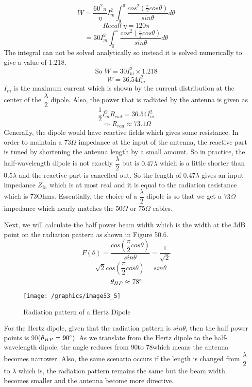 \[ W = \frac{60^2\pi}{\eta} I_m^2 \int_{0}^{\pi} \frac{cos^2(\frac{\pi}{2}cos\theta)}{sin\theta}d\theta \]
\[Recall\ \eta = 120\pi \]
\[ = 30I_m^2 \int_{0}^{\pi}\dfrac{cos^2(\frac{\pi}{2}cos\theta)}{sin\theta}d\theta \]
The integral can not be solved analytically so instead it is solved numerically to give a value of 1.218.
\[ \text{So } W = 30I_m^2 \times 1.218 \]
\begin{equation}
W = 36.54I_m^2
\end{equation}
$I_m$ is the maximum current which is shown by the current distribution at the center of the $\dfrac{\lambda}{2}$ dipole.
Also, the power that is radiated by the antenna is given as $$\dfrac{1}{2}I_m^2 R_{rad} = 36.54I_m^2$$
\[ \Rightarrow R_{rad} \approx 73.1\Omega \]
Generally, the dipole would have reactive fields which gives some resistance. In order to maintain a $73\Omega$ impedance at the input of the antenna, the reactive part is tuned by shortening the antenna length by a small amount. So in practice, the half-wavelength dipole is not exactly $\dfrac{\lambda}{2}$ but is $0.47\lambda$ which is a little shorter than $0.5\lambda$ and the reactive part is cancelled out. So the length of $0.47\lambda$ gives an input impedance $Z_{in}$ which is at most real and it is equal to the radiation resistance which is 73Ohms. Essentially, the choice of a $\dfrac{\lambda}{2}$ dipole is so that we get a $73\Omega$ impedance which nearly matches the $50\Omega$ or $75\Omega$ cables.

Next, we will calculate the half power beam width which is the width at the 3dB point on the radiation pattern as shown in Figure 50.6.
\[ F(\theta) = \dfrac{cos(\dfrac{\pi}{2}cos\theta)}{sin\theta} = \dfrac{1}{\sqrt{2}} \]
\[ = \sqrt{2}cos(\dfrac{\pi}{2}cos\theta) = sin\theta \]
\[ \theta_{HP} \approx 78\text{\textdegree} \]
\begin{figure}[h]
\centering
\texttt{[image: /graphics/image53\_5]}
\caption{Radiation pattern of a Hertz Dipole}
\label{fig:fig5}
\end{figure}

For the Hertz dipole, given that the radiation pattern is $sin\theta$, then the half power points is 90\textdegree($\theta_{HP} = 90\text{\textdegree}$). As we translate from the Hertz dipole to the half-wavelength dipole, the angle reduces from 90\textdegree to 78\textdegree  which means the antenna becomes narrower. Also, the same scenario occurs if the length is changed from $\dfrac{\lambda}{2}$ to $\lambda$ which is, the radiation pattern remains the same but the beam width becomes smaller and the antenna become more directive.

